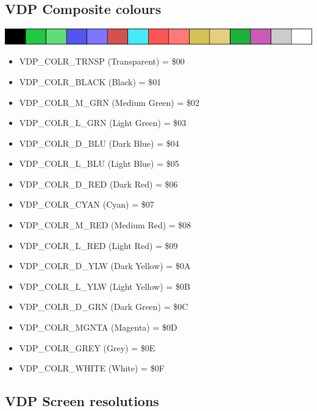 \documentclass[a4paper,11pt]{article}
\begin{document}
    \subsection{VDP Composite colours}
    
    \includegraphics[scale=0.7]{images/TMS9918Apalette.png}

    \begin{itemize}
        \item VDP\_COLR\_TRNSP  (Transparent)   = \$00
        \item VDP\_COLR\_BLACK  (Black)         = \$01
        \item VDP\_COLR\_M\_GRN (Medium Green)  = \$02
        \item VDP\_COLR\_L\_GRN (Light Green)   = \$03
        \item VDP\_COLR\_D\_BLU (Dark Blue)     = \$04
        \item VDP\_COLR\_L\_BLU (Light Blue)    = \$05
        \item VDP\_COLR\_D\_RED (Dark Red)      = \$06
        \item VDP\_COLR\_CYAN   (Cyan)          = \$07
        \item VDP\_COLR\_M\_RED (Medium Red)    = \$08
        \item VDP\_COLR\_L\_RED (Light Red)     = \$09
        \item VDP\_COLR\_D\_YLW (Dark Yellow)   = \$0A
        \item VDP\_COLR\_L\_YLW (Light Yellow)  = \$0B
        \item VDP\_COLR\_D\_GRN (Dark Green)    = \$0C
        \item VDP\_COLR\_MGNTA  (Magenta)       = \$0D
        \item VDP\_COLR\_GREY   (Grey)          = \$0E
        \item VDP\_COLR\_WHITE  (White)         = \$0F
    \end{itemize}

    \subsection{VDP Screen resolutions}
    \label{sec:vdpscrmodes}
\end{document}
